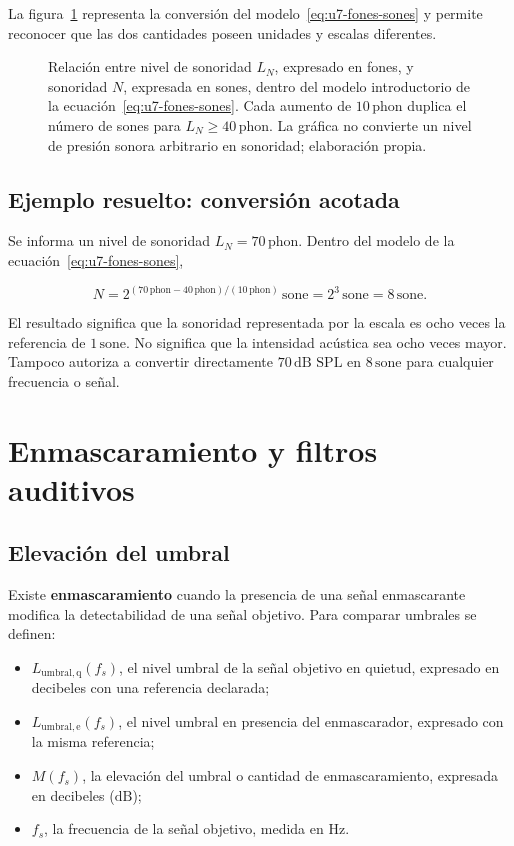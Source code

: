 La figura~\ref{fig:u7-fones-sones} representa la conversión del
modelo~\eqref{eq:u7-fones-sones} y permite reconocer que las dos cantidades
poseen unidades y escalas diferentes.

\begin{figure}[htbp]
    \centering
    
    \caption{Relación entre nivel de sonoridad \(L_N\), expresado en fones, y
    sonoridad \(N\), expresada en sones, dentro del modelo introductorio de la
    ecuación~\eqref{eq:u7-fones-sones}. Cada aumento de
    \(10\,\text{phon}\) duplica el número de sones para
    \(L_N\geq40\,\text{phon}\). La gráfica no convierte un nivel de presión
    sonora arbitrario en sonoridad; elaboración propia.}
    \label{fig:u7-fones-sones}
\end{figure}

\subsection{Ejemplo resuelto: conversión acotada}
\label{sec:u7-ejemplo-sones}

Se informa un nivel de sonoridad \(L_N=70\,\text{phon}\). Dentro del modelo de
la ecuación~\eqref{eq:u7-fones-sones},

\[
    N
      =2^{(70\,\text{phon}-40\,\text{phon})/(10\,\text{phon})}
       \,\text{sone}
      =2^3\,\text{sone}
      =8\,\text{sone}.
\]

El resultado significa que la sonoridad representada por la escala es ocho
veces la referencia de \(1\,\text{sone}\). No significa que la intensidad
acústica sea ocho veces mayor. Tampoco autoriza a convertir directamente
\(70\,\text{dB SPL}\) en \(8\,\text{sone}\) para cualquier frecuencia o
señal.

\section{Enmascaramiento y filtros auditivos}
\label{sec:u7-enmascaramiento}

\subsection{Elevación del umbral}
\label{sec:u7-elevacion-umbral}

Existe \textbf{enmascaramiento} cuando la presencia de una señal
enmascarante modifica la detectabilidad de una señal objetivo. Para comparar
umbrales se definen:

\begin{itemize}
    \item \(L_{\mathrm{umbral,q}}(f_s)\), el nivel umbral de la señal objetivo
    en quietud, expresado en decibeles con una referencia declarada;
    \item \(L_{\mathrm{umbral,e}}(f_s)\), el nivel umbral en presencia del
    enmascarador, expresado con la misma referencia;
    \item \(M(f_s)\), la elevación del umbral o cantidad de enmascaramiento,
    expresada en decibeles (\(\text{dB}\));
    \item \(f_s\), la frecuencia de la señal objetivo, medida en
    \(\text{Hz}\).
\end{itemize}

